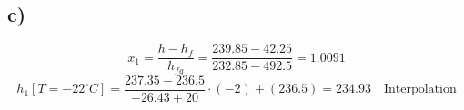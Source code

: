 

\subsection*{c)}
\[
x_1 = \frac{h - h_f}{h_{fg}} = \frac{239.85 - 42.25}{232.85 - 492.5} = 1.0091
\]
\[
h_1 [T=-22^\circ C] = \frac{237.35 - 236.5}{-26.43 + 20} \cdot (-2) + (236.5) = 234.93 \quad \text{Interpolation}
\]